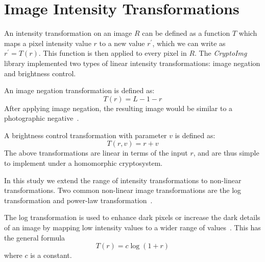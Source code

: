 
\section{Image Intensity Transformations}
An intensity transformation on an image $R$ can be defined as a function $T$ which maps a pixel intensity value $r$ to a new value $r^\prime$, which we can write as $r^\prime = T\left(r\right)$. This function is then applied to every pixel in $R$.
The \textit{CryptoImg} library implemented two types of linear intensity transformations: image negation and brightness control.

An image negation transformation is defined as:
\begin{equation}
    T\left(r\right) = L-1-r
\end{equation}
After applying image negation, the resulting image would be similar to a photographic negative~\cite{gonzalez_digital_2008}.

A brightness control transformation with parameter $v$ is defined as:
\begin{equation}
    T\left(r,v\right) = r+v
\end{equation}
The above transformations are linear in terms of the input $r$, and are thus simple to implement under a homomorphic cryptosystem.

In this study we extend the range of intensity transformations to non-linear transformations. Two common non-linear image transformations are the log transformation and power-law transformation~\cite{gonzalez_digital_2008}.

The log transformation is used to enhance dark pixels or increase the dark details of an image by mapping low intensity values to a wider range of values~\cite{gonzalez_digital_2008}. This has the general formula
\begin{equation}
    T\left(r\right) = c \log\left(1 + r\right)
\end{equation}
where $c$ is a constant.

